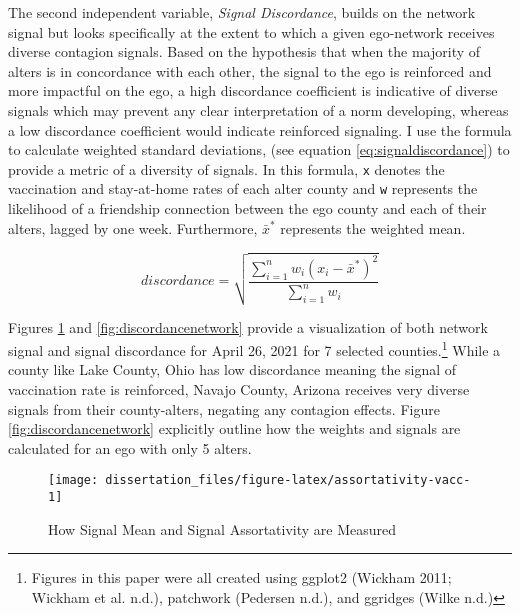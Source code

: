 The second independent variable, \emph{Signal Discordance}, builds on the network
signal but looks specifically at the extent to which a given ego-network
receives diverse contagion signals. Based on the hypothesis that when the
majority of alters is in concordance with each other, the signal to the ego is
reinforced and more impactful on the ego, a high discordance coefficient is
indicative of diverse signals which may prevent any clear interpretation of a
norm developing, whereas a low discordance coefficient would indicate reinforced
signaling. I use the formula to calculate weighted standard deviations, (see equation
\eqref{eq:signaldiscordance}) to provide a metric of a diversity of signals. In
this formula, \texttt{x} denotes the vaccination and stay-at-home rates of each alter
county and \texttt{w} represents the likelihood of a friendship connection between the
ego county and each of their alters, lagged by one week. Furthermore, \(\bar{x}^*\)
represents the weighted mean.

\begin{equation}
discordance = \sqrt{\frac{\sum_{i=1}^nw_i(x_i-\bar{x}^*)^2}{\sum^n_{i=1}w_i}} \label{eq:signaldiscordance}
\end{equation}

Figures \ref{fig:assortativity-vacc} and \ref{fig:discordancenetwork} provide
a visualization of both network signal and signal discordance for April 26, 2021
for 7 selected counties.\footnote{Figures in this paper were all created using ggplot2
  (Wickham 2011; Wickham et al. n.d.), patchwork (Pedersen n.d.), and ggridges (Wilke n.d.)}
While a county like Lake County, Ohio has low discordance meaning the signal of
vaccination rate is reinforced, Navajo County, Arizona receives very diverse
signals from their county-alters, negating any contagion effects. Figure
\ref{fig:discordancenetwork} explicitly outline how the weights and signals are
calculated for an ego with only 5 alters.

\begin{figure}

{\centering \texttt{[image: dissertation\_files/figure-latex/assortativity-vacc-1]} 

}

\caption{How Signal Mean and Signal Assortativity are Measured}\label{fig:assortativity-vacc}
\end{figure}


